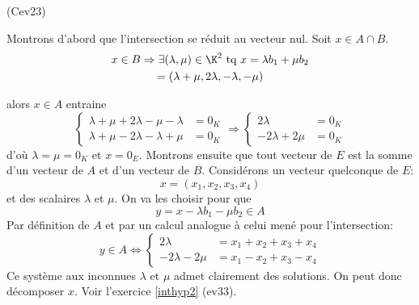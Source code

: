 \begin{tiny}(Cev23)\end{tiny} Montrons d'abord que l'intersection se réduit au vecteur nul. Soit $x\in A\cap B$.
\begin{multline*}
  x \in B \Rightarrow \exists (\lambda,\mu)\in \K^2 \text{ tq } x = \lambda b_1 + \mu b_2\\
  = (\lambda + \mu, 2\lambda, -\lambda,-\mu)
\end{multline*}

alors $x\in A$ entraine
\begin{displaymath}
\left\lbrace 
\begin{aligned}
  \lambda + \mu + 2\lambda -\mu -\lambda &= 0_K \\
  \lambda + \mu - 2\lambda -\lambda + \mu &= 0_K
\end{aligned}
\right. 
\Rightarrow
\left\lbrace 
\begin{aligned}
  2\lambda &= 0_K \\ -2\lambda + 2\mu &= 0_K
\end{aligned}
\right. 
\end{displaymath}
d'où $\lambda=\mu=0_K$ et $x=0_E$.\newline
Montrons ensuite que tout vecteur de $E$ est la somme d'un vecteur de $A$ et d'un vecteur de $B$.
Considérons un vecteur quelconque de $E$:
\begin{displaymath}
  x = (x_1,x_2,x_3,x_4)
\end{displaymath}
et des scalaires $\lambda$ et $\mu$. On va les choisir pour que 
\begin{displaymath}
  y = x -\lambda b_1 - \mu b_2 \in A 
\end{displaymath}
Par définition de $A$ et par un calcul analogue à celui mené pour l'intersection:
\begin{displaymath}
  y \in A \Leftrightarrow
\left\lbrace 
\begin{aligned}
  2\lambda &= x_1+x_2+x_3+x_4 \\
  -2\lambda - 2\mu &= x_1-x_2+x_3-x_4
\end{aligned}
\right. 
\end{displaymath}
Ce système aux inconnues $\lambda$ et $\mu$ admet clairement des solutions. On peut donc décomposer $x$.\newline
Voir l'exercice \ref{inthyp2} (ev33).
